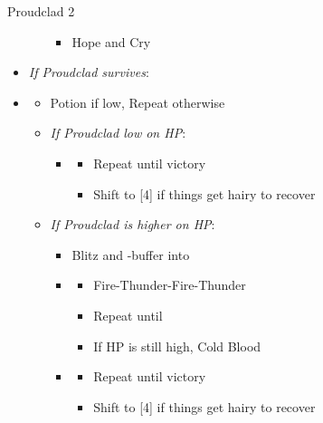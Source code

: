 \begin{battle}{Proudclad 2}
\begin{multicols}{2}
\begin{itemize}
\begin{itemize}
\begin{itemize}
            \item Hope and Cry
        \end{itemize}
    \end{itemize}
    \item \textit{If Proudclad survives}:
    \item \fourth
    \begin{itemize}
        \item Potion if low, Repeat otherwise
        \item \textit{If Proudclad low on HP}:
        \begin{itemize}
            \item \second
            \begin{itemize}
                \item Repeat until victory
                \item Shift to [4] if things get hairy to recover
            \end{itemize}
        \end{itemize}
        \item \textit{If Proudclad is higher on HP}:
        \begin{itemize}
            \item Blitz and \rav-buffer into
            \item \sixth
            \begin{itemize}
                \item Fire-Thunder-Fire-Thunder
                \item Repeat until \stagger
                \item If HP is still high, Cold Blood
            \end{itemize}
            \item \second
            \begin{itemize}
                \item Repeat until victory
                \item Shift to [4] if things get hairy to recover
            \end{itemize}
        \end{itemize}
    \end{itemize}
\end{itemize}
\end{multicols}
\end{battle}
